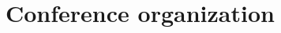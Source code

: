 \documentclass[12pt,a4paper,sans,fontset=windows]{moderncv} %
\begin{document}
\begin{comment}
\vspace{2pt}

\cvitem{Feb 2019}{\textbf{The Ohio State University}, Student Homotopy Theory Seminar, "Reedy model structure"}

\vspace{2pt}

\cvitem{Sep 2018}{\textbf{The Ohio State University}, Student Homotopy Theory Seminar, "Postnikov tower and obstruction theory for ring spectra"}

\vspace{2pt}


\cvitem{Sep 2018}{\textbf{The Ohio State University}, Student Homotopy Theory Seminar, "Postnikov tower and obstruction theory for spaces"}

\vspace{2pt}


\cvitem{Sep 2018}{\textbf{The Ohio State University}, Graduate Student Seminar, "Localization methods in algebraic topology"}

\vspace{2pt}

\cvitem{Mar 2018}{\textbf{The Ohio State University}, Student Homotopy Theory Seminar, "Constructing Bousfield localization of spaces"}

\vspace{2pt}

\cvitem{Sep 2017}{\textbf{The Ohio State University}, Student Homotopy Theory Seminar, "Bousfield localization of model category"}

\vspace{2pt}

\cvitem{May 2017}{\textbf{Gooding Talbot house}, The MIT Talbot Workshop: Obstruction theory for structured ring spectra, "Topological Andre-Quillen cohomology"}

\vspace{2pt}

\cvitem{Feb 2017}{\textbf{The Ohio State University}, Student Infinity Category Seminar, "Spectra and Stable Homotopy Category"}

\vspace{2pt}

\end{comment}


\section{Conference organization}

\vspace{3pt} 
\end{document}
